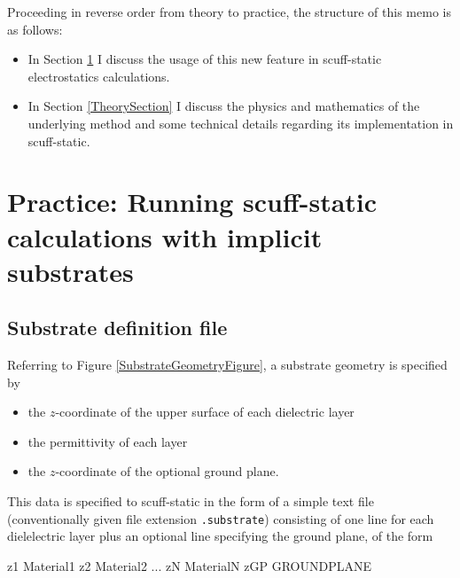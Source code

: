\documentclass[letterpaper]{article}
\begin{document}
Proceeding in reverse order from theory to practice, the 
structure of this memo is as follows:

\begin{itemize}
\item 
In Section \ref{ImplementationSection} I discuss the usage
of this new feature in {\sc scuff-static} electrostatics calculations.

\item 
In Section \ref{TheorySection} I discuss the physics and
mathematics of the underlying method and some technical details
regarding its implementation in {\sc scuff-static}.
\end{itemize}

\newpage
\section{Practice: Running {\sc scuff-static} calculations
         with implicit substrates}
\label{ImplementationSection}

\subsection{Substrate definition file}

Referring to Figure \ref{SubstrateGeometryFigure},
a substrate geometry is specified by
\begin{itemize}
 \item the $z$-coordinate of the upper surface of each dielectric layer
 \item the permittivity of each layer
 \item the $z$-coordinate of the optional ground plane.
\end{itemize}

This data is specified to {\sc scuff-static} in the
form of a simple text file (conventionally given file
extension \texttt{.substrate}) consisting of one line for each
dielelectric layer plus an optional line specifying the ground 
plane, of the form

\medskip

\begin{verbcode}
z1  Material1
z2  Material2
...
zN  MaterialN
zGP GROUNDPLANE
\end{verbcode}
\end{document}
